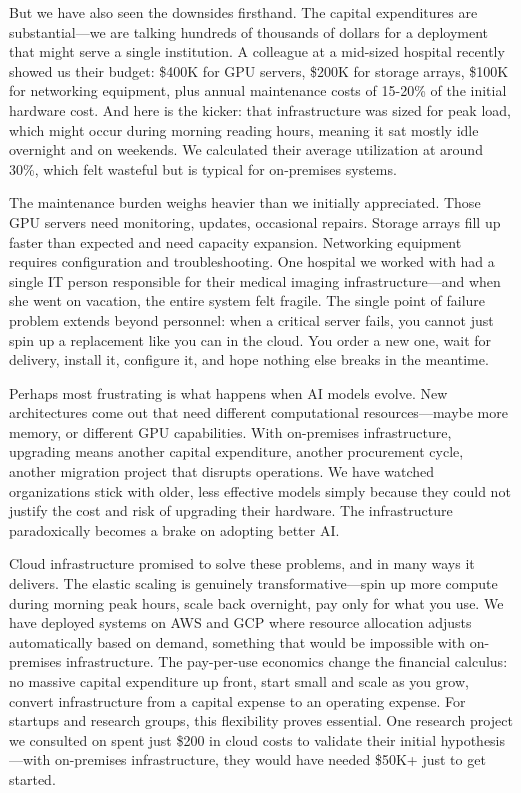 \documentclass[12pt,a4paper]{article}
\begin{document}
But we have also seen the downsides firsthand. The capital expenditures are substantial—we are talking hundreds of thousands of dollars for a deployment that might serve a single institution. A colleague at a mid-sized hospital recently showed us their budget: \$400K for GPU servers, \$200K for storage arrays, \$100K for networking equipment, plus annual maintenance costs of 15-20\% of the initial hardware cost. And here is the kicker: that infrastructure was sized for peak load, which might occur during morning reading hours, meaning it sat mostly idle overnight and on weekends. We calculated their average utilization at around 30\%, which felt wasteful but is typical for on-premises systems.

The maintenance burden weighs heavier than we initially appreciated. Those GPU servers need monitoring, updates, occasional repairs. Storage arrays fill up faster than expected and need capacity expansion. Networking equipment requires configuration and troubleshooting. One hospital we worked with had a single IT person responsible for their medical imaging infrastructure—and when she went on vacation, the entire system felt fragile. The single point of failure problem extends beyond personnel: when a critical server fails, you cannot just spin up a replacement like you can in the cloud. You order a new one, wait for delivery, install it, configure it, and hope nothing else breaks in the meantime.

Perhaps most frustrating is what happens when AI models evolve. New architectures come out that need different computational resources—maybe more memory, or different GPU capabilities. With on-premises infrastructure, upgrading means another capital expenditure, another procurement cycle, another migration project that disrupts operations. We have watched organizations stick with older, less effective models simply because they could not justify the cost and risk of upgrading their hardware. The infrastructure paradoxically becomes a brake on adopting better AI.

Cloud infrastructure promised to solve these problems, and in many ways it delivers. The elastic scaling is genuinely transformative—spin up more compute during morning peak hours, scale back overnight, pay only for what you use. We have deployed systems on AWS and GCP where resource allocation adjusts automatically based on demand, something that would be impossible with on-premises infrastructure. The pay-per-use economics change the financial calculus: no massive capital expenditure up front, start small and scale as you grow, convert infrastructure from a capital expense to an operating expense. For startups and research groups, this flexibility proves essential. One research project we consulted on spent just \$200 in cloud costs to validate their initial hypothesis—with on-premises infrastructure, they would have needed \$50K+ just to get started.
\end{document}

